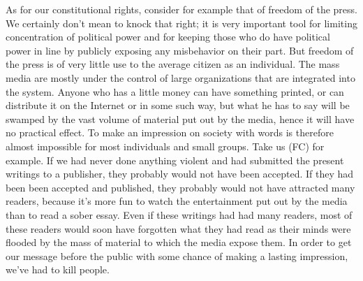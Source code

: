  As for our constitutional rights, consider for example that of freedom of the press. We certainly don’t mean to knock that right; it is very important tool for limiting concentration of political power and for keeping those who do have political power in line by publicly exposing any misbehavior on their part. But freedom of the press is of very little use to the average citizen as an individual. The mass media are mostly under the control of large organizations that are integrated into the system. Anyone who has a little money can have something printed, or can distribute it on the Internet or in some such way, but what he has to say will be swamped by the vast volume of material put out by the media, hence it will have no practical effect. To make an impression on society with words is therefore almost impossible for most individuals and small groups. Take us (FC) for example. If we had never done anything violent and had submitted the present writings to a publisher, they probably would not have been accepted. If they had been been accepted and published, they probably would not have attracted many readers, because it’s more fun to watch the entertainment put out by the media than to read a sober essay. Even if these writings had had many readers, most of these readers would soon have forgotten what they had read as their minds were flooded by the mass of material to which the media expose them. In order to get our message before the public with some chance of making a lasting impression, we’ve had to kill people.

